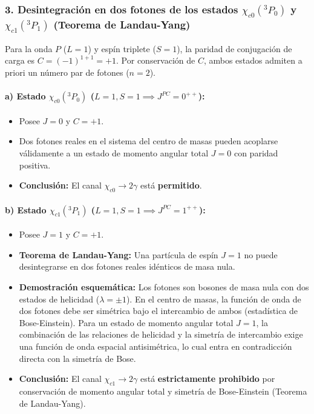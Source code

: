 \begin{problema}
\subsubsection*{3. Desintegración en dos fotones de los estados $\chi_{c0}(^3P_0)$ y $\chi_{c1}(^3P_1)$ (Teorema de Landau-Yang)}

Para la onda $P$ ($L=1$) y espín triplete ($S=1$), la paridad de conjugación de carga es $C = (-1)^{1+1} = +1$. Por conservación de $C$, ambos estados admiten a priori un número par de fotones ($n=2$).

\paragraph{a) Estado $\chi_{c0}(^3P_0)$ ($L=1, S=1 \implies J^{PC} = 0^{++}$):}
\begin{itemize}
    \item Posee $J=0$ y $C=+1$.
    \item Dos fotones reales en el sistema del centro de masas pueden acoplarse válidamente a un estado de momento angular total $J=0$ con paridad positiva.
    \item \textbf{Conclusión:} El canal $\chi_{c0} \rightarrow 2\gamma$ está \textbf{permitido}.
\end{itemize}

\paragraph{b) Estado $\chi_{c1}(^3P_1)$ ($L=1, S=1 \implies J^{PC} = 1^{++}$):}
\begin{itemize}
    \item Posee $J=1$ y $C=+1$.
    \item \textbf{Teorema de Landau-Yang:} Una partícula de espín $J=1$ no puede desintegrarse en dos fotones reales idénticos de masa nula.
    \item \textbf{Demostración esquemática:} Los fotones son bosones de masa nula con dos estados de helicidad ($\lambda = \pm 1$). En el centro de masas, la función de onda de dos fotones debe ser simétrica bajo el intercambio de ambos (estadística de Bose-Einstein). Para un estado de momento angular total $J=1$, la combinación de las relaciones de helicidad y la simetría de intercambio exige una función de onda espacial antisimétrica, lo cual entra en contradicción directa con la simetría de Bose.
    \item \textbf{Conclusión:} El canal $\chi_{c1} \rightarrow 2\gamma$ está \textbf{estrictamente prohibido} por conservación de momento angular total y simetría de Bose-Einstein (Teorema de Landau-Yang).
\end{itemize}
\end{problema}
